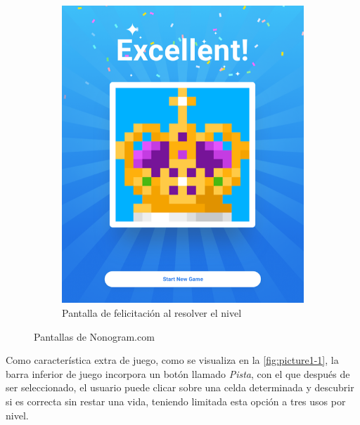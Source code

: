 \begin{figure}[h!]
\begin{subfigure}[b]{0.45\linewidth}
     \includegraphics[width=\linewidth]{images/picturecross2.png}
     \caption{Pantalla de felicitación al resolver el nivel}
     \label{fig:picture1-2}
   \end{subfigure}
   \caption{Pantallas de Nonogram.com}
   \label{fig:picture1}
 \end{figure}

Como característica extra de juego, como se visualiza en la \autoref{fig:picture1-1}, la barra inferior de juego incorpora un botón llamado \textit{Pista}, 
con el que después de ser seleccionado, 
el usuario puede clicar sobre una celda determinada y descubrir si es correcta sin restar una vida, teniendo limitada esta opción a tres usos por nivel.

